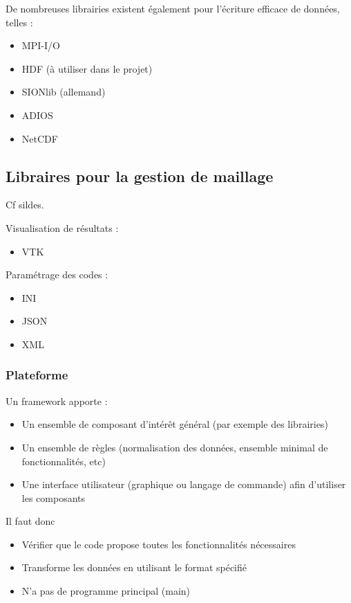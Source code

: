 \documentclass{article}
\begin{document}
De nombreuses librairies existent également pour l'écriture efficace de données, telles :
\begin{itemize}
\item MPI-I/O
\item HDF (à utiliser dans le projet)
\item SIONlib (allemand)
\item ADIOS
\item NetCDF
\end{itemize}

\subsection{Libraires pour la gestion de maillage}
Cf sildes.


Visualisation de résultats :
\begin{itemize}
\item VTK
\end{itemize}
\bigskip

Paramétrage des codes :
\begin{itemize}
\item INI
\item JSON
\item XML
\end{itemize}


\subsubsection{Plateforme}
Un framework apporte :
\begin{itemize}
\item Un ensemble de composant d'intérêt général (par exemple des librairies)
\item Un ensemble de règles (normalisation des données, ensemble minimal de fonctionnalités, etc)
\item Une interface utilisateur (graphique ou langage de commande) afin d'utiliser les composants
\end{itemize}
\bigskip

Il faut donc
\begin{itemize}
\item Vérifier que le code propose toutes les fonctionnalités nécessaires
\item Transforme les données en utilisant le format spécifié
\item N'a pas de programme principal (main)
\end{itemize}
\bigskip
\end{document}
